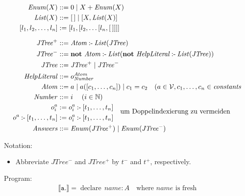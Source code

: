 \documentclass{article}
\begin{document}
\begin{align*}
  \mathit{Enum}(X) & \mathrel{::=} 0 \mid X + \mathit{Enum}(X) \\
  \mathit{List}(X) &\mathrel{::=} [\,] \mid [X, \mathit{List}(X)] \\
  [l_1,l_2,\dots, l_n] &\mathrel{:=} [l_1,[l_2, \dots [l_n,[\,]]]]\\[\medskipamount]
  \mathit{JTree^+} &\mathrel{::=} \mathit{Atom} \mathbin{\text{:-}} \mathit{List}(\mathit{JTree}) \\
  \mathit{JTree^-} &\mathrel{::=} \mathbf{not}\ \mathit{Atom} \mathbin{\text{:-}} \mathit{List}(\mathbf{not}\ \mathit{HelpLiteral} \mathbin{\text{:-}} \mathit{List}(\mathit{JTree})) \\
  \mathit{JTree} &\mathrel{::=} \mathit{JTree^+} \mid \mathit{JTree^-}\\
  \mathit{HelpLiteral} &\mathrel{::=} o_\mathit{Number}^\mathit{Atom} \\
  \mathit{Atom}    &\mathrel{::= } a \mid a([c_1,\dots,c_n]) \mid c_1 = c_2 \quad (a \in \mathcal{V}, c_1,\dots,c_n\in \mathit{constants} \\
  \mathit{Number} &\mathrel{::= i} \quad (i \in \mathbb{N}) \\
  o_i^a &:= o_i^a \mathbin{\text{:-}} [t_1,\dots,t_n] \\
  o^a \mathbin{\text{:-}} [t_1,\dots,t_n] &:= o_i^a \mathbin{\text{:-}} [t_1,\dots,t_n]\smash{\raisebox{0.5\baselineskip + 0.5\jot}{$\hspace{10pt}\text{um Doppelindexierung zu vermeiden}$}}\\
\mathit{Answers} &\mathrel{::=} \mathit{Enum}(\mathit{JTree^+}) \mid \mathit{Enum}(\mathit{JTree^-})
\end{align*}

Notation:

\begin{itemize}
\item Abbreviate $JTree^-$ and $JTree^+$ by $t^-$ and $t^+$, respectively.
 
\end{itemize}

Program:
\begin{align*}
  \llbracket \texttt{a.} \rrbracket = \operatorname{declare}\, \mathit{name} :A\quad \text{where }\mathit{name}\text{ is fresh}
\end{align*}
\end{document}
